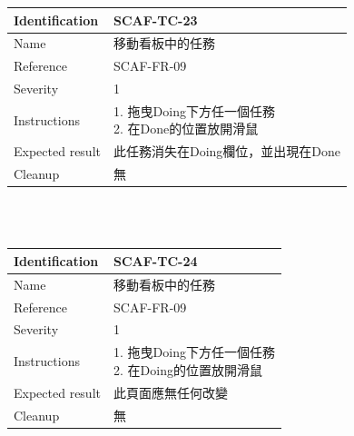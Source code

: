 \documentclass{report}
\begin{document}
\begin{tabularx}{\textwidth}{
  |p{}%
  |p{}|%
  }
  \hline
  \centering Identification &  SCAF-TC-23 \\
  \hline
  \centering Name & 移動看板中的任務 \\
  \hline
  \centering Reference & SCAF-FR-09 \\
  \hline
  \centering Severity & 1 \\
  \hline
  \centering Instructions & 
  \makecell[l]{
    1. 拖曳Doing下方任一個任務  \\
    2. 在Done的位置放開滑鼠 
  }\\
  \hline
  \centering Expected result & 此任務消失在Doing欄位，並出現在Done \\
  \hline
  \centering Cleanup & 無 \\
  \hline
\end{tabularx}
\\
\newline
\\
\begin{tabularx}{\textwidth}{
  |p{}%
  |p{}|%
  }
  \hline
  \centering Identification &  SCAF-TC-24 \\
  \hline
  \centering Name & 移動看板中的任務 \\
  \hline
  \centering Reference & SCAF-FR-09 \\
  \hline
  \centering Severity & 1 \\
  \hline
  \centering Instructions & 
  \makecell[l]{
    1. 拖曳Doing下方任一個任務  \\
    2. 在Doing的位置放開滑鼠  \\
  }\\
  \hline
  \centering Expected result & 此頁面應無任何改變 \\
  \hline
  \centering Cleanup & 無 \\
  \hline
\end{tabularx}
\\
\newline
\\
\end{document}

